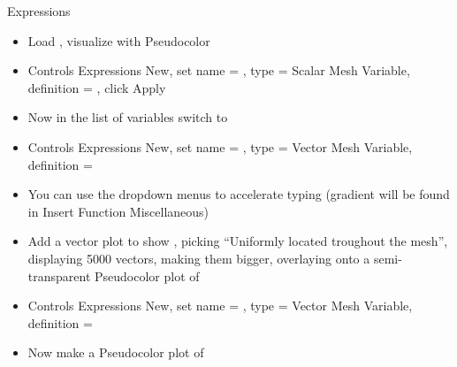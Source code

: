 \begin{frame}{Expressions}
  \begin{beamerboxesrounded}[upper=block head,lower=block body,shadow=true]{}
    \begin{itemize}\setlength{\itemsep}{0mm}
    \item Load , visualize  with Pseudocolor
    \item Controls \ra Expressions \ra New, set name = , type = Scalar Mesh Variable,
      definition = , click Apply
    \item Now in the list of variables switch to 
    \end{itemize}
  \end{beamerboxesrounded}
  \medskip
  \pause
  \begin{beamerboxesrounded}[upper=block head,lower=block body,shadow=true]{}
    \begin{itemize}\setlength{\itemsep}{0mm}
    \item Controls \ra Expressions \ra New, set name = , type = Vector Mesh Variable,
      definition = 
    \item You can use the dropdown menus to accelerate typing (gradient
      will be found in Insert Function \ra Miscellaneous)
    \item Add a vector plot to show , picking ``Uniformly located troughout the mesh'',
      displaying 5000 vectors, making them bigger, overlaying onto a semi-transparent Pseudocolor
      plot of 
    \end{itemize}
  \end{beamerboxesrounded}
  \medskip
  \pause
  \begin{beamerboxesrounded}[upper=block head,lower=block body,shadow=true]{}
    \begin{itemize}\setlength{\itemsep}{0mm}
    \item Controls \ra Expressions \ra New, set name = , type = Vector Mesh Variable,
      definition = 
    \item Now make a Pseudocolor plot of 
    \end{itemize}
  \end{beamerboxesrounded}
\end{frame}

